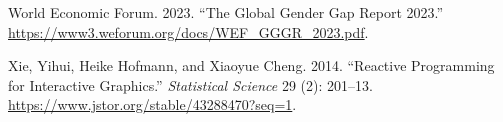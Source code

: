\documentclass[
]{interact}
\newlength{\cslhangindent}
\newlength{\cslentryspacingunit} %
\newenvironment{CSLReferences}[2] %
 {%
  \setlength{\parindent}{0pt}
  \ifodd #1
  \let\oldpar\par
  \def\par{\hangindent=\cslhangindent\oldpar}
  \fi
  \setlength{\parskip}{#2\cslentryspacingunit}
 }%
 {}
\begin{document}
\begin{CSLReferences}{1}{0}
\leavevmode{}%
World Economic Forum. 2023. {``{The Global Gender Gap Report 2023}.''}
\url{https://www3.weforum.org/docs/WEF_GGGR_2023.pdf}.

\leavevmode{}%
Xie, Yihui, Heike Hofmann, and Xiaoyue Cheng. 2014. {``Reactive
{Programming} for {Interactive} {Graphics}.''} \emph{Statistical
Science} 29 (2): 201--13.
\url{https://www.jstor.org/stable/43288470?seq=1}.

\end{CSLReferences}
\end{document}
